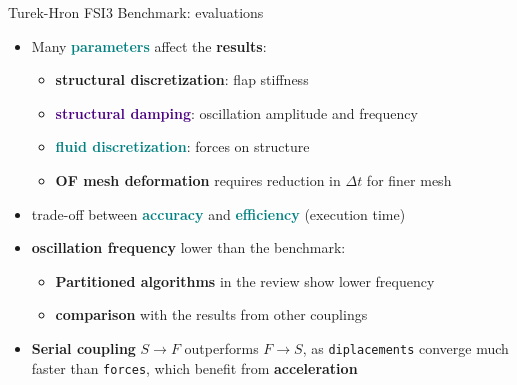 \documentclass[10pt,t]{beamer}
\begin{document}
\begin{frame}{Turek-Hron FSI3 Benchmark: evaluations}
    
    \begin{itemize}
        \item Many \textcolor{teal}{\textbf{parameters}} affect the \textbf{results}:
        
        \vspace{2mm}
        
        \begin{itemize}
            \item \textcolor{dorange}{\textbf{structural discretization}}: flap stiffness
            \item \textcolor{indigo}{\textbf{structural damping}}: oscillation amplitude and frequency
            \item \textcolor{teal}{\textbf{fluid discretization}}: forces on structure
            \item \textcolor{dblue}{\textbf{OF mesh deformation}} requires reduction in $\Delta t$ for finer mesh
        \end{itemize}
        
        \vspace{3mm}
        
        \item trade-off between \textcolor{teal}{\textbf{accuracy}} and \textcolor{teal}{\textbf{efficiency}} (execution time)
        
        \vspace{3mm}
        
        \item \textcolor{fgreen}{\textbf{oscillation frequency}} lower than the benchmark:
        
        \vspace{2mm}
        
        \begin{itemize}
            \item \textbf{Partitioned algorithms} in the review show lower frequency
            \item \textbf{comparison} with the results from other couplings
        \end{itemize}
        
        \vspace{3mm}
        
        \item \textbf{Serial coupling} $S \to F$ outperforms $F \to S$, as \texttt{diplacements} converge much faster than \texttt{forces}, which benefit from \textbf{acceleration}
        
    \end{itemize}
    
    
\end{frame}
\end{document}
